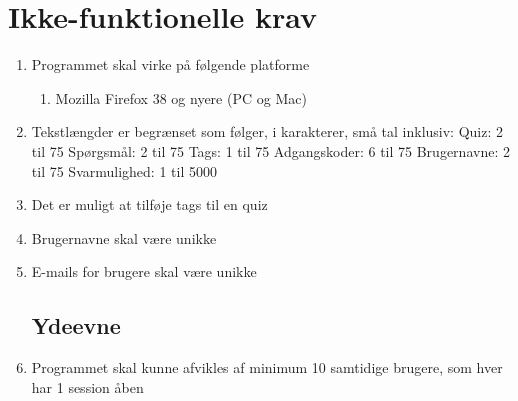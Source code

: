 \section{Ikke-funktionelle krav}
\label{sec:nonFunctional}

\begin{enumerate}
	\subsection*{Brugbarhed}
	\item Programmet skal virke på følgende platforme
	\begin{enumerate}
		\item Mozilla Firefox 38 og nyere (PC og Mac)
	\end{enumerate}
	
	\item Tekstlængder er begrænset som følger, i karakterer, små tal inklusiv:
	\subitem Quiz: 2 til 75
	\subitem Spørgsmål: 2 til 75
	\subitem Tags: 1 til 75 
	\subitem Adgangskoder: 6 til 75
	\subitem Brugernavne: 2 til 75
	\subitem Svarmulighed: 1 til 5000
	\item Det er muligt at tilføje tags til en quiz
	\item Brugernavne skal være unikke
	\item E-mails for brugere skal være unikke
	
	\subsection*{Ydeevne}
	\item Programmet skal kunne afvikles af minimum 10 samtidige brugere, som hver har 1 session åben
\end{enumerate}